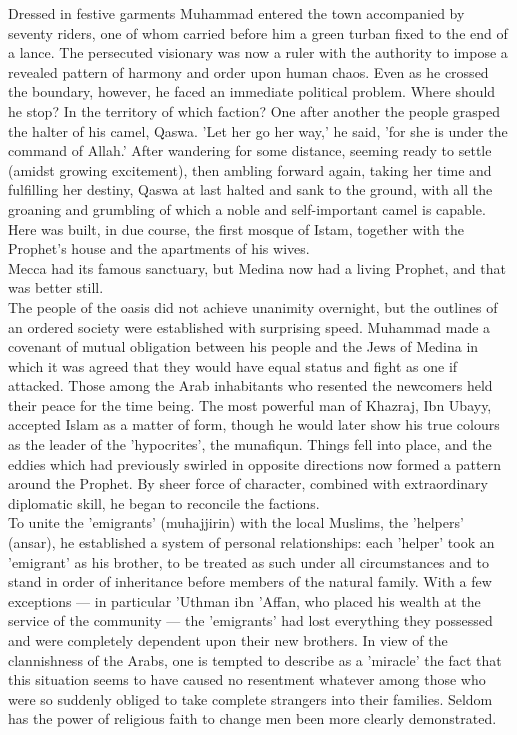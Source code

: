 \documentclass[11pt, b5paper, twoside]{book}
\begin{document}
Dressed in festive garments Muhammad entered the town accompanied by seventy riders, one of whom 
carried before him a green turban fixed to the end of a lance. The persecuted visionary was now a 
ruler with the authority to impose a revealed pattern of harmony and order upon human chaos. Even as 
he crossed the boundary, however, he faced an immediate political problem. Where should he stop? In 
the territory of which faction? One after another the people grasped the halter of his camel, Qaswa. 
'Let her go her way,' he said, 'for she is under the command of Allah.' After wandering for some 
distance, seeming ready to settle (amidst growing excitement), then ambling forward again, taking her 
time and fulfilling her destiny, Qaswa at last halted and sank to the ground, with all the groaning 
and grumbling of which a noble and self-important camel is capable. Here was built, in due course, 
the first mosque of Istam, together with the Prophet's house and the apartments of his wives. \\

Mecca had its famous sanctuary, but Medina now had a living Prophet, and that was better still. \\

The people of the oasis did not achieve unanimity overnight, but the outlines of an ordered society 
were established with surprising speed. Muhammad made a covenant of mutual obligation between his 
people and the Jews of Medina in which it was agreed that they would have equal status and fight as 
one if attacked. Those among the Arab inhabitants who resented the newcomers held their peace for the 
time being. The most powerful man of Khazraj, Ibn Ubayy, accepted Islam as a matter of form, though 
he would later show his true colours as the leader of the 'hypocrites', the munafiqun. Things fell 
into place, and the eddies which had previously swirled in opposite directions now formed a pattern 
around the Prophet. By sheer force of character, combined with extraordinary diplomatic skill, he 
began to reconcile the factions. \\

To unite the 'emigrants' (muhajjirin) with the local Muslims, the 'helpers' (ansar), he established a 
system of personal relationships: each 'helper' took an 'emigrant' as his brother, to be treated as 
such under all circumstances and to stand in order of inheritance before members of the natural 
family. With a few exceptions --- in particular 'Uthman ibn 'Affan, who placed his wealth at the 
service of the community --- the 'emigrants' had lost everything they possessed and were completely 
dependent upon their new brothers. In view of the clannishness of the Arabs, one is tempted to 
describe as a 'miracle' the fact that this situation seems to have caused no resentment whatever 
among those who were so suddenly obliged to take complete strangers into their families. Seldom has 
the power of religious faith to change men been more clearly demonstrated. \\
\end{document}
